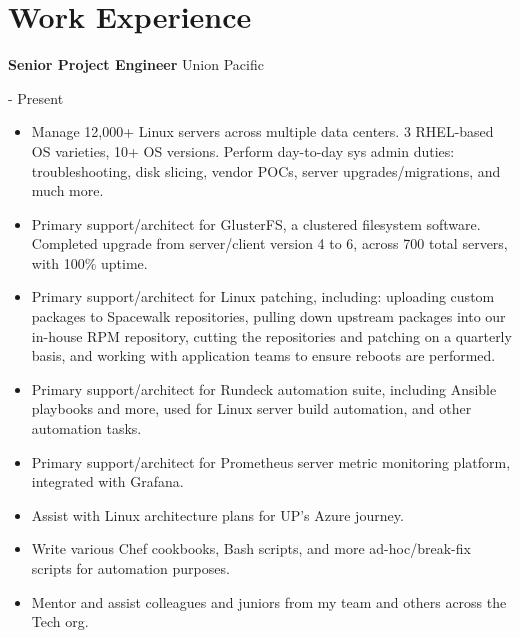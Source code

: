 \documentclass[10pt, a4paper]{article}
\begin{document}
\section*{Work Experience}
\begin{itemize}
    \begin{minipage}{0.5\textwidth} %
        \raggedright %
        \item \textbf{Senior Project Engineer} Union Pacific
    \end{minipage}
    \begin{minipage}{0.5\textwidth} %
         \-- Present
    \end{minipage}
    \begin{itemize}
        \item Manage 12,000+ Linux servers across multiple data centers. 3 RHEL-based OS varieties, 10+ OS versions. Perform day-to-day sys admin duties: troubleshooting, disk slicing, vendor POCs, server upgrades/migrations, and much more.
        \item Primary support/architect for GlusterFS, a clustered filesystem software. Completed upgrade from server/client version 4 to 6, across 700 total servers, with 100\% uptime.
        \item Primary support/architect for Linux patching, including: uploading custom packages to Spacewalk repositories, pulling down upstream packages into our in-house RPM repository, cutting the repositories and patching on a quarterly basis, and working with application teams to ensure reboots are performed.
        \item Primary support/architect for Rundeck automation suite, including Ansible playbooks and more, used for Linux server build automation, and other automation tasks.
        \item Primary support/architect for Prometheus server metric monitoring platform, integrated with Grafana.
        \item Assist with Linux architecture plans for UP's Azure journey.
        \item Write various Chef cookbooks, Bash scripts, and more ad-hoc/break-fix scripts for automation purposes.
        \item Mentor and assist colleagues and juniors from my team and others across the Tech org.
    \end{itemize}
    \begin{minipage}{0.5\textwidth} %

\end{minipage}
\end{itemize}
\end{document}
